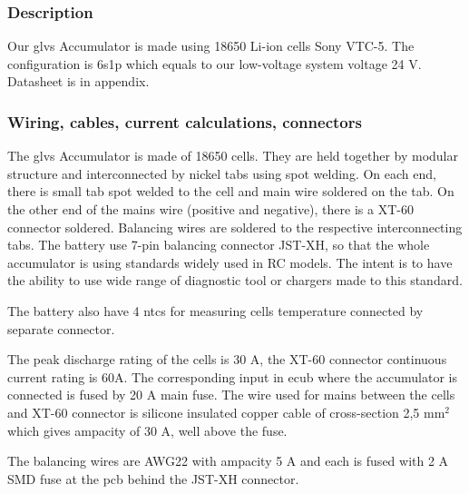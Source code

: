 \subsubsection{Description}
Our \gls{glvs} Accumulator is made using 18650 Li-ion cells Sony VTC-5. The configuration is 6s1p which equals to our low-voltage system voltage 24 V. Datasheet is in appendix.

\subsubsection{Wiring, cables, current calculations, connectors}

The \gls{glvs} Accumulator is made of 18650 cells. They are held together by modular structure and interconnected by nickel tabs using spot welding. On each end, there is small tab spot welded to the cell and main wire soldered on the tab. On the other end of the mains wire (positive and negative), there is a XT-60 connector soldered. Balancing wires are soldered to the respective interconnecting tabs. The battery use 7-pin balancing connector JST-XH, so that the whole accumulator is using standards widely used in RC models. The intent is to have the ability to use wide range of diagnostic tool or chargers made to this standard.

The battery also have 4 \glspl{ntc} for measuring cells temperature connected by separate connector.

The peak discharge rating of the cells is 30 A, the XT-60 connector continuous current rating is 60A. The corresponding input in \gls{ecub} where the accumulator is connected is fused by 20 A main fuse. The wire used for mains between the cells and XT-60 connector is silicone insulated copper cable of cross-section 2,5 mm$^2$ which gives ampacity of 30 A, well above the fuse.

The balancing wires are AWG22 with ampacity 5 A and each is fused with 2 A SMD fuse at the \gls{pcb} behind the JST-XH connector.

